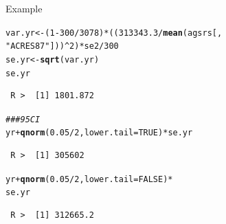 \documentclass[10pt]{beamer}\usepackage[]{graphicx}\usepackage[]{xcolor}
\makeatletter
\newcommand{\hlnum}[1]{\textcolor[rgb]{0.686,0.059,0.569}{#1}}%
\newcommand{\hlstr}[1]{\textcolor[rgb]{0.192,0.494,0.8}{#1}}%
\newcommand{\hlcom}[1]{\textcolor[rgb]{0.678,0.584,0.686}{\textit{#1}}}%
\newcommand{\hlopt}[1]{\textcolor[rgb]{0,0,0}{#1}}%
\newcommand{\hlstd}[1]{\textcolor[rgb]{0.345,0.345,0.345}{#1}}%
\newcommand{\hlkwb}[1]{\textcolor[rgb]{0.69,0.353,0.396}{#1}}%
\newcommand{\hlkwc}[1]{\textcolor[rgb]{0.333,0.667,0.333}{#1}}%
\newcommand{\hlkwd}[1]{\textcolor[rgb]{0.737,0.353,0.396}{\textbf{#1}}}%
\newenvironment{kframe}{%
 \def\at@end@of@kframe{}%
 \ifinner\ifhmode%
  \def\at@end@of@kframe{\end{minipage}}%
  \begin{minipage}{\columnwidth}%
 \fi\fi%
 \def\FrameCommand##1{\hskip\@totalleftmargin \hskip-\fboxsep
 \colorbox{shadecolor}{##1}\hskip-\fboxsep
     \hskip-\linewidth \hskip-\@totalleftmargin \hskip\columnwidth}%
 \MakeFramed {\advance\hsize-\width
   \@totalleftmargin\z@ \linewidth\hsize
   \@setminipage}}%
 {\par\unskip\endMakeFramed%
 \at@end@of@kframe}
\newenvironment{knitrout}{}{} %
\makeatother
\begin{document}
\begin{frame}[containsverbatim]{Example}
\small
\begin{knitrout}
\color{fgcolor}\begin{kframe}
\begin{alltt}
\hlstd{var.yr} \hlkwb{<-} \hlstd{(}\hlnum{1} \hlopt{-} \hlnum{300}\hlopt{/}\hlnum{3078}\hlstd{)} \hlopt{*} \hlstd{((}\hlnum{313343.3}\hlopt{/}\hlkwd{mean}\hlstd{(agsrs[,}
    \hlstr{"ACRES87"}\hlstd{]))}\hlopt{^}\hlnum{2}\hlstd{)} \hlopt{*} \hlstd{se2}\hlopt{/}\hlnum{300}
\hlstd{se.yr} \hlkwb{<-} \hlkwd{sqrt}\hlstd{(var.yr)}
\hlstd{se.yr}
\end{alltt}
\begin{verbatim}
 R >  [1] 1801.872
\end{verbatim}
\begin{alltt}
\hlcom{### 95 CI}
\hlstd{yr} \hlopt{+} \hlkwd{qnorm}\hlstd{(}\hlnum{0.05}\hlopt{/}\hlnum{2}\hlstd{,} \hlkwc{lower.tail} \hlstd{=} \hlnum{TRUE}\hlstd{)} \hlopt{*} \hlstd{se.yr}
\end{alltt}
\begin{verbatim}
 R >  [1] 305602
\end{verbatim}
\begin{alltt}
\hlstd{yr} \hlopt{+} \hlkwd{qnorm}\hlstd{(}\hlnum{0.05}\hlopt{/}\hlnum{2}\hlstd{,} \hlkwc{lower.tail} \hlstd{=} \hlnum{FALSE}\hlstd{)} \hlopt{*}
    \hlstd{se.yr}
\end{alltt}
\begin{verbatim}
 R >  [1] 312665.2
\end{verbatim}
\end{kframe}
\end{knitrout}
\end{frame}
\end{document}
